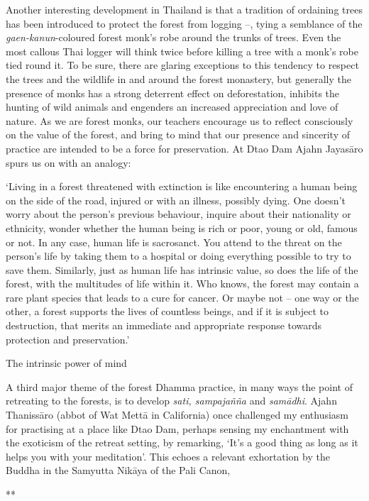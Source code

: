 Another interesting development in Thailand is that a tradition of
ordaining trees has been introduced to protect the forest from logging
--, tying a semblance of the \emph{gaen-kanun}-coloured forest monk's
robe around the trunks of trees. Even the most callous Thai logger will
think twice before killing a tree with a monk's robe tied round it. To
be sure, there are glaring exceptions to this tendency to respect the
trees and the wildlife in and around the forest monastery, but generally
the presence of monks has a strong deterrent effect on deforestation,
inhibits the hunting of wild animals and engenders an increased
appreciation and love of nature. As we are forest monk\emph{s}, our
teachers encourage us to reflect consciously on the value of the forest,
and bring to mind that our presence and sincerity of practice are
intended to be a force for preservation. At Dtao Dam Ajahn Jayasāro
spurs us on with an analogy:

`Living in a forest threatened with extinction is like encountering a
human being on the side of the road, injured or with an illness,
possibly dying. One doesn't worry about the person's previous behaviour,
inquire about their nationality or ethnicity, wonder whether the human
being is rich or poor, young or old, famous or not. In any case, human
life is sacrosanct. You attend to the threat on the person's life by
taking them to a hospital or doing everything possible to try to save
them. Similarly, just as human life has intrinsic value, so does the
life of the forest, with the multitudes of life within it. Who knows,
the forest may contain a rare plant species that leads to a cure for
cancer. Or maybe not -- one way or the other, a forest supports the
lives of countless beings, and if it is subject to destruction, that
merits an immediate and appropriate response towards protection and
preservation.'

The intrinsic power of mind

A third major theme of the forest Dhamma practice, in many ways the
point of retreating to the forests, is to develop \emph{sati,
sampajañña} and \emph{samādhi}. Ajahn Thanissāro (abbot of Wat Mettā in
California) once challenged my enthusiasm for practising at a place like
Dtao Dam, perhaps sensing my enchantment with the exoticism of the
retreat setting, by remarking, `It's a good thing as long as it helps
you with your meditation'. This echoes a relevant exhortation by the
Buddha in the Samyutta Nikāya of the Pali Canon,

**


